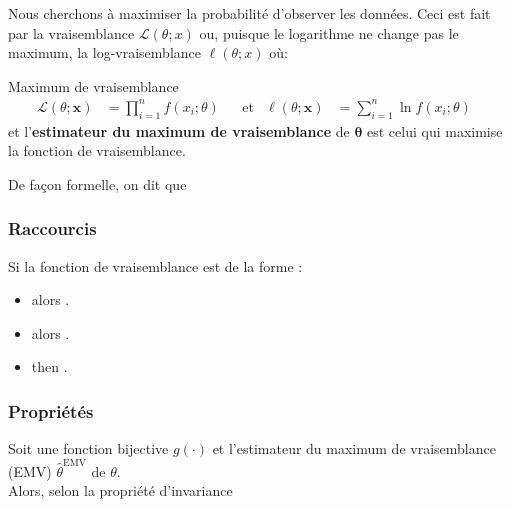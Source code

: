 \documentclass[10pt, french]{article}
\begin{document}
\begin{multicols*}{2}
Nous cherchons à maximiser la probabilité d'observer les données.
Ceci est fait par la vraisemblance $\mathcal{L}(\theta; x)$ ou, puisque le logarithme ne change pas le maximum, la log-vraisemblance $\ell(\theta; x)$ où:

\begin{algo}{Maximum de vraisemblance}
\begin{align*}
	\mathcal{L}(\theta; \bm{x})
	&=	\prod_{i = 1}^{n}	f(x_{i}; \theta)	&
	&\text{et}	&
	\ell(\theta; \bm{x})
	&=	\sum_{i = 1}^{n} \ln	f(x_{i}; \theta)	&
\end{align*}
et l'\textbf{estimateur du maximum de vraisemblance} de $\bm\theta$ est celui qui maximise la fonction de vraisemblance.
\end{algo}

De façon formelle, on dit que 

\subsubsection{Raccourcis}

Si la fonction de vraisemblance est de la forme :
\begin{itemize}
	\item	{} alors .
	\item	{} alors .
	\item	{} then .
\end{itemize}


\subsubsection{Propriétés}
\begin{definitionNOHFILL}
Soit une fonction bijective $g(\cdot)$ et l'estimateur du maximum de vraisemblance (EMV) $\hat{\theta}^{\text{EMV}}$ de $\theta$.\\
Alors, selon la propriété d'invariance \\


\end{definitionNOHFILL}
\end{multicols*}
\end{document}
